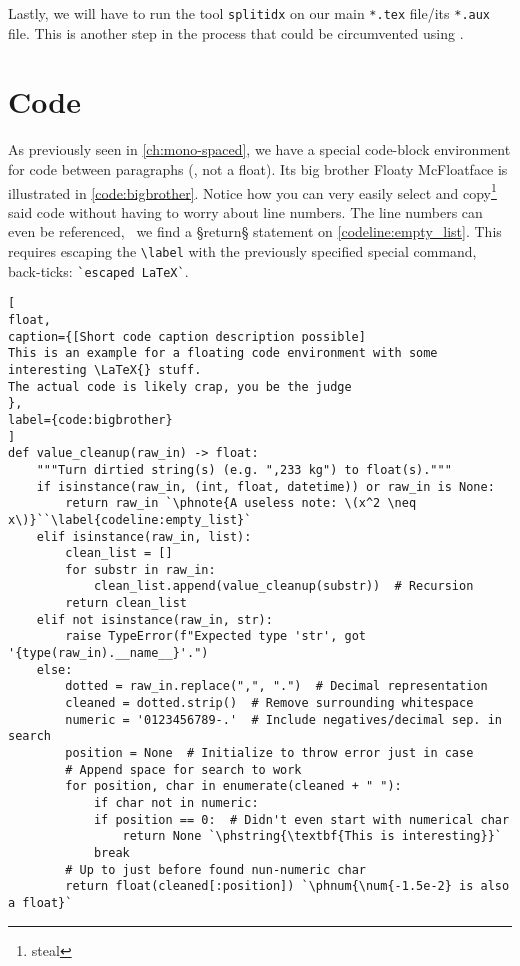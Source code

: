 Lastly, we will have to run the tool \texttt{splitidx} on our main \texttt{*.tex} file/its \texttt{*.aux} file.
This is another step in the process that could be circumvented using .
\section{Code}
As previously seen in \cref{ch:mono-spaced}, we have a special code-block environment for code between paragraphs (, not a float).
Its big brother Floaty McFloatface is illustrated in \cref{code:bigbrother}.
Notice how you can very easily select and copy\footnote{steal} said code without having to worry about line numbers.
The line numbers can even be referenced, \ we find a §return§ statement on \cref{codeline:empty_list}.
This requires escaping the \verb|\label| with the previously specified special command, back-ticks: \verb|`escaped LaTeX`|.

\begin{lstlisting}[
float,
caption={[Short code caption description possible]
This is an example for a floating code environment with some interesting \LaTeX{} stuff.
The actual code is likely crap, you be the judge
},
label={code:bigbrother}
]
def value_cleanup(raw_in) -> float:
	"""Turn dirtied string(s) (e.g. ",233 kg") to float(s)."""
	if isinstance(raw_in, (int, float, datetime)) or raw_in is None:
		return raw_in `\phnote{A useless note: \(x^2 \neq x\)}``\label{codeline:empty_list}`
	elif isinstance(raw_in, list):
		clean_list = []
		for substr in raw_in:
			clean_list.append(value_cleanup(substr))  # Recursion
		return clean_list
	elif not isinstance(raw_in, str):
		raise TypeError(f"Expected type 'str', got '{type(raw_in).__name__}'.")
	else:
		dotted = raw_in.replace(",", ".")  # Decimal representation
		cleaned = dotted.strip()  # Remove surrounding whitespace
		numeric = '0123456789-.'  # Include negatives/decimal sep. in search
		position = None  # Initialize to throw error just in case
		# Append space for search to work
		for position, char in enumerate(cleaned + " "):
			if char not in numeric:
			if position == 0:  # Didn't even start with numerical char
				return None `\phstring{\textbf{This is interesting}}`
			break
		# Up to just before found nun-numeric char
		return float(cleaned[:position]) `\phnum{\num{-1.5e-2} is also a float}`
\end{lstlisting}

